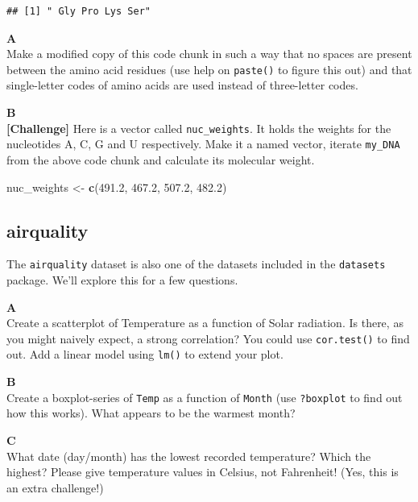 \documentclass[]{book}
\newenvironment{Shaded}{\begin{snugshade}}{\end{snugshade}}
\newcommand{\FloatTok}[1]{\textcolor[rgb]{0.00,0.00,0.81}{#1}}
\newcommand{\KeywordTok}[1]{\textcolor[rgb]{0.13,0.29,0.53}{\textbf{#1}}}
\newcommand{\NormalTok}[1]{#1}
\newcommand{\StringTok}[1]{\textcolor[rgb]{0.31,0.60,0.02}{#1}}
\begin{document}
\begin{verbatim}
## [1] " Gly Pro Lys Ser"
\end{verbatim}

\textbf{A}\\
Make a modified copy of this code chunk in such a way that no spaces are present between the amino acid residues (use help on \texttt{paste()} to figure this out) and that single-letter codes of amino acids are used instead of three-letter codes.

\textbf{B}\\
\textbf{{[}Challenge{]}} Here is a vector called \texttt{nuc\_weights}. It holds the weights for the nucleotides A, C, G and U respectively. Make it a named vector, iterate \texttt{my\_DNA} from the above code chunk and calculate its molecular weight.

\begin{Shaded}
\begin{Highlighting}[]
\NormalTok{nuc_weights <-}\StringTok{ }\KeywordTok{c}\NormalTok{(}\FloatTok{491.2}\NormalTok{, }\FloatTok{467.2}\NormalTok{, }\FloatTok{507.2}\NormalTok{, }\FloatTok{482.2}\NormalTok{)}
\end{Highlighting}
\end{Shaded}

\hypertarget{airquality}{%
\subsection{airquality}\label{airquality}}

The \texttt{airquality} dataset is also one of the datasets included in the \texttt{datasets} package. We'll explore this for a few questions.

\textbf{A}\\
Create a scatterplot of Temperature as a function of Solar radiation. Is there, as you might naively expect, a strong correlation? You could use \texttt{cor.test()} to find out. Add a linear model using \texttt{lm()} to extend your plot.

\textbf{B}\\
Create a boxplot-series of \texttt{Temp} as a function of \texttt{Month} (use \texttt{?boxplot} to find out how this works). What appears to be the warmest month?

\textbf{C}\\
What date (day/month) has the lowest recorded temperature? Which the highest? Please give temperature values in Celsius, not Fahrenheit! (Yes, this is an extra challenge!)
\end{document}
